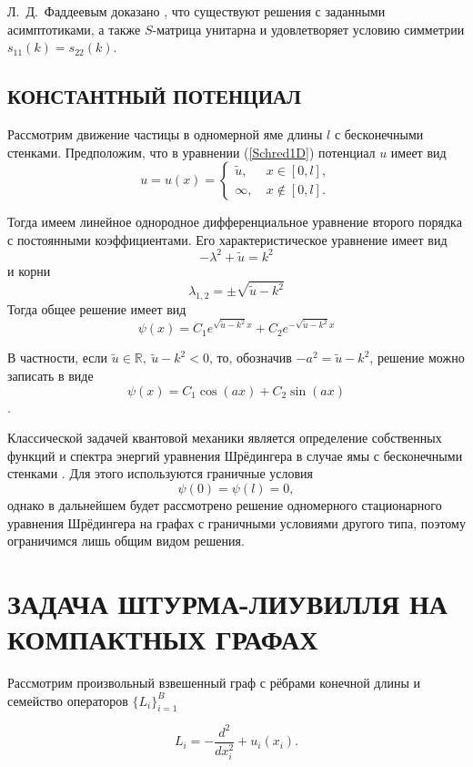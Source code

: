 \documentclass[a4 paper, 12 pt]{extarticle}
\begin{document}
   Л.~Д.~Фаддеевым доказано \cite{SMatrix}, что существуют решения с заданными асимптотиками, а также $S$-матрица унитарна и удовлетворяет условию симметрии $s_{11}\left(k\right) = s_{22}\left(k\right)$.
   
   \subsection{КОНСТАНТНЫЙ ПОТЕНЦИАЛ}
   Рассмотрим движение частицы в одномерной яме длины $l$ с бесконечными стенками.
   Предположим, что в уравнении (\ref{Schred1D}) потенциал $u$ имеет вид 
   $$u = u\left(x\right) = \begin{cases}
   \tilde{u}, & \ x \in \left[0,l\right],\\
   \infty,    & \ x \notin \left[0,l\right].
   \end{cases}$$
   
   Тогда имеем линейное однородное дифференциальное уравнение второго порядка с постоянными коэффициентами. Его характеристическое уравнение имеет вид
   \[-\lambda^2+\tilde{u} = k^2\]
   и корни
   \[\lambda_{1,2}=\pm \sqrt{\tilde{u}-k^2}\]
   Тогда общее решение имеет вид
   \[
   \psi\left(x\right)= C_1 e^{\sqrt{\tilde{u}-k^2}x} + C_2 e^{-\sqrt{\tilde{u}-k^2}x}
   \]
   
   В частности, если $\tilde{u} \in \mathbb{R}, \ \tilde{u}-k^2<0$, то, обозначив $-a^2=\tilde{u}-k^2$, решение можно записать в виде \[\psi\left(x\right)= C_1 \cos\left(ax\right)+ C_2 \sin\left(ax\right)\].
   
   Классической задачей квантовой механики является определение собственных функций и спектра энергий уравнения Шрёдингера в случае ямы с бесконечными стенками \cite{Landau}. Для этого используются граничные условия 
   \[\psi\left(0\right) = \psi\left(l\right) = 0,\]
   однако в дальнейшем будет рассмотрено решение одномерного стационарного уравнения Шрёдингера на графах с граничными условиями другого типа, поэтому ограничимся лишь общим видом решения.
   
   \section{ЗАДАЧА ШТУРМА-ЛИУВИЛЛЯ НА КОМПАКТНЫХ ГРАФАХ}

   Рассмотрим произвольный взвешенный граф с рёбрами конечной длины и семейство операторов $\{L_i\}_{i=1}^B$

   \begin{equation}\label{LOp}
   L_i = -\frac{d^2}{dx_i^2} + u_i(x_i).
   \end{equation}
\end{document}
